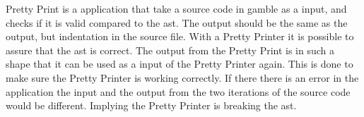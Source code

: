 Pretty Print is a application that take a source code in \gls{gamble} as a input, and checks if it is valid compared to the \acrshort{ast}. 
The output should be the same as the output, but indentation in the source file.
With a Pretty Printer it is possible to assure that the \acrshort{ast} is correct.
The output from the Pretty Print is in such a shape that it can be used as a input of the Pretty Printer again.
This is done to make sure the Pretty Printer is working correctly.
If there there is an error in the application the input and the output from the two iterations of the source code would be different.
Implying the Pretty Printer is breaking the \acrshort{ast}.